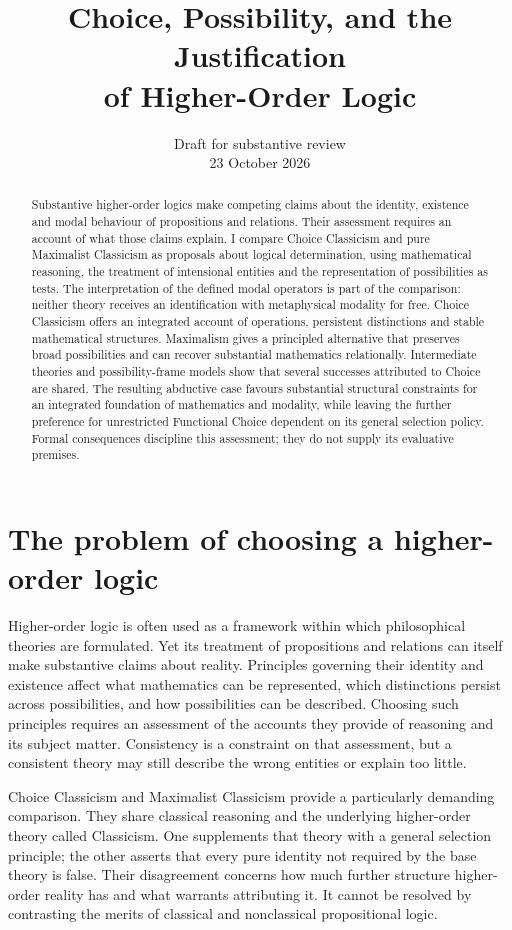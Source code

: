 \documentclass[11pt]{article}
\title{Choice, Possibility, and the Justification\\of Higher-Order Logic}
\author{}
\date{Draft for substantive review\\23 October 2026}
\begin{document}
\maketitle
\begin{abstract}
Substantive higher-order logics make competing claims about the identity, existence and modal behaviour of propositions and relations. Their assessment requires an account of what those claims explain. I compare Choice Classicism and pure Maximalist Classicism as proposals about logical determination, using mathematical reasoning, the treatment of intensional entities and the representation of possibilities as tests. The interpretation of the defined modal operators is part of the comparison: neither theory receives an identification with metaphysical modality for free. Choice Classicism offers an integrated account of operations, persistent distinctions and stable mathematical structures. Maximalism gives a principled alternative that preserves broad possibilities and can recover substantial mathematics relationally. Intermediate theories and possibility-frame models show that several successes attributed to Choice are shared. The resulting abductive case favours substantial structural constraints for an integrated foundation of mathematics and modality, while leaving the further preference for unrestricted Functional Choice dependent on its general selection policy. Formal consequences discipline this assessment; they do not supply its evaluative premises.
\end{abstract}

\section{The problem of choosing a higher-order logic}\label{sec:problem}

Higher-order logic is often used as a framework within which philosophical theories are formulated. Yet its treatment of propositions and relations can itself make substantive claims about reality. Principles governing their identity and existence affect what mathematics can be represented, which distinctions persist across possibilities, and how possibilities can be described. Choosing such principles requires an assessment of the accounts they provide of reasoning and its subject matter. Consistency is a constraint on that assessment, but a consistent theory may still describe the wrong entities or explain too little.

Choice Classicism and Maximalist Classicism provide a particularly demanding comparison. They share classical reasoning and the underlying higher-order theory called Classicism. One supplements that theory with a general selection principle; the other asserts that every pure identity not required by the base theory is false. Their disagreement concerns how much further structure higher-order reality has and what warrants attributing it. It cannot be resolved by contrasting the merits of classical and nonclassical propositional logic.
\end{document}
